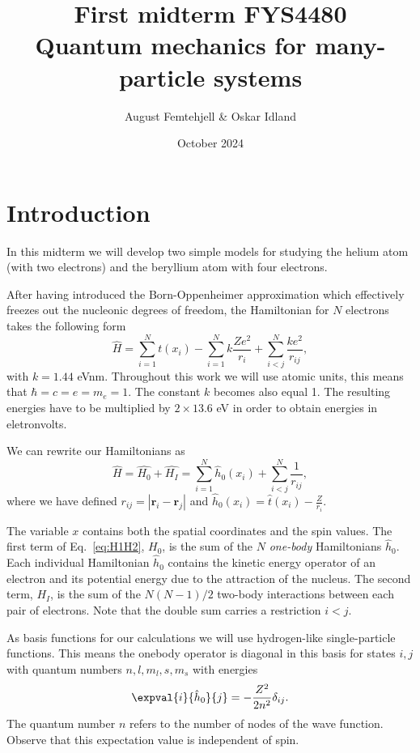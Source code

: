 \documentclass{article}
\title{
    First midterm FYS4480\\
    Quantum mechanics for many-particle systems
}
\author{August Femtehjell \& Oskar Idland}
\date{October 2024}
\begin{document}
\maketitle

\section*{Introduction}

In this midterm we will develop two simple models for studying the helium atom (with two electrons) and the beryllium atom with four electrons.

After having introduced the  Born-Oppenheimer approximation which effectively freezes out the nucleonic degrees of freedom, the Hamiltonian for \(N\) electrons takes the following form
\begin{equation*}
    \hat{H} = \sum_{i=1}^{N} t(x_i) - \sum_{i=1}^{N} k\frac{Ze^2}{r_i} + \sum_{i<j}^{N} \frac{ke^2}{r_{ij}},
\end{equation*}
with \(k=1.44\) eVnm.
Throughout this work we will use atomic units, this means that \(\hbar = c = e = m_e = 1\).
The constant \(k\) becomes also equal 1.
The resulting energies have to be multiplied by \(2 \times 13.6\) eV in order to obtain energies in eletronvolts.

We can rewrite our Hamiltonians as
\begin{equation}
    \hat{H} = \hat{H_0} + \hat{H_I}
    = \sum_{i=1}^{N}\hat{h}_0(x_i) + \sum_{i<j}^{N}\frac{1}{r_{ij}},
    \label{eq:H1H2}
\end{equation}
where  we have defined \(r_{ij} = |\bm{r}_i - \bm{r}_j|\) and \(\hat{h}_0(x_i) =  \hat{t}(x_i) - \frac{Z}{r_i}\).

The variable \(x\) contains both the spatial coordinates and the spin values.
The first term of Eq.~\eqref{eq:H1H2}, \(H_0\), is the sum of the \(N\) \emph{one-body} Hamiltonians \(\hat{h}_0\).
Each individual Hamiltonian \(\hat{h}_0\) contains the kinetic energy operator of an electron and its potential energy due to the attraction of the nucleus.
The second term, \(H_I\), is the sum of the \(N(N-1)/2\) two-body interactions between each pair of electrons.
Note that the double sum carries a restriction \(i<j\).

As basis functions for our calculations we will use hydrogen-like single-particle functions.
This means the onebody operator is diagonal in this basis for states \(i,j\) with quantum numbers
\(n,l,m_l,s,m_s\) with energies
\begin{equation}
    \expval{i}{\hat{h}_0}{j} = -\frac{Z^2}{2n^2}\delta_{ij}.
    \label{eq:onebody}
\end{equation}
The quantum number \(n\) refers to the number of nodes of the wave function.
Observe that this expectation value is independent of spin.
\end{document}
